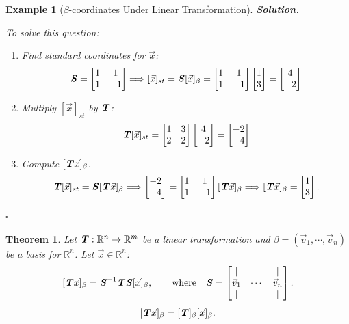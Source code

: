 \documentclass[12pt, a4paper]{article}
\newtheorem{thm}{Theorem}[subsection]
\newtheorem{eg}{Example}[subsection]
\newenvironment*{sol}{\indent\textbf{Solution. }}{\hfill{$\square$}\par}
\def\R{{\mathbb{R}}}
\def\T{{\textbf{\emph{T}}}}
\def\vecx{\vec{x}}
\def\vecv{\vec{v}}
\def\matrixS{\textbf{\emph{S}}}
\begin{document}
\begin{eg}[$\beta$-coordinates Under Linear Transformation]
\begin{sol}
\begin{center}
		\end{center}
		To solve this question: 
		\begin{enumerate}
			\item Find standard coordinates for $\vecx$: 
				\[\matrixS=\begin{bmatrix}1&1\\1&-1\end{bmatrix}\Longrightarrow[\vecx]_{st}=\matrixS[\vecx]_\beta=\begin{bmatrix}1&1\\1&-1\end{bmatrix}\begin{bmatrix}1\\3\end{bmatrix}=\begin{bmatrix}4\\-2\end{bmatrix}\]
			\item Multiply $[\vecx]_{st}$ by $\T$: 
				\[\T[\vecx]_{st}=\begin{bmatrix}1 & 3\\2 & 2\end{bmatrix}\begin{bmatrix}4\\-2\end{bmatrix}=\begin{bmatrix}-2\\-4\end{bmatrix}\]
			\item Compute $[\T\vecx]_\beta$.
				\[\T[\vecx]_{st}=\matrixS[\T\vecx]_\beta\Longrightarrow\begin{bmatrix}-2\\-4\end{bmatrix}=\begin{bmatrix}1&1\\1&-1\end{bmatrix}[\T\vecx]_\beta\Longrightarrow[\T\vecx]_\beta=\begin{bmatrix}1\\3\end{bmatrix}.\]
		\end{enumerate}
	\end{sol}
\end{eg}
\begin{thm}
	Let $\T: \R^n\to\R^m$ be a linear transformation and $\beta=(\vecv_1,\cdots,\vecv_n)$ be a basis for $\R^n$. Let $\vecx\in\R^n$: \[[\T\vecx]_\beta=\matrixS^{-1}\T\matrixS[\vecx]_\beta,\qquad\text{where}\quad\matrixS=\begin{bmatrix}|&&|\\\vecv_1&\cdots&\vecv_n\\|&&|\end{bmatrix}.\] 	\[[\T\vecx]_\beta=[\T]_\beta[\vecx]_\beta.\]
\end{thm}
\end{document}
